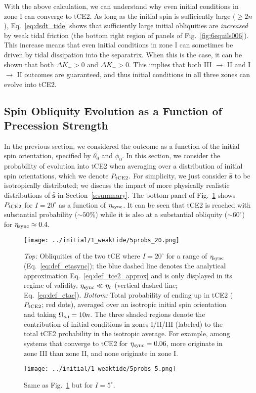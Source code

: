 \documentclass[
        fleqn,
        usenatbib,
        referee,
    ]{mnras}
\newcommand*{\uv}[1]{\hat{\boldsymbol{\mathbf{#1}}}}
\newlength{\colummwidth}
\begin{document}
With the above calculation, we can understand why even initial conditions in
zone I can converge to tCE2. As long as the initial spin is sufficiently large
($\geq 2n$), Eq.~\eqref{eq:dsdt_tide} shows that sufficiently large initial
obliquities are \emph{increased} by weak tidal friction (the bottom right
region of panels of Fig.~\ref{fig:6equils006}). This increase means that even
initial conditions in zone I can sometimes be driven by tidal dissipation into
the separatrix. When this is the case, it can be shown that both $\Delta K_+ >
0$ and $\Delta K_- > 0$. This implies that both III $\to$ II and I $\to$ II
outcomes are guaranteed, and thus initial conditions in all three zones can
evolve into tCE2.

\subsection{Spin Obliquity Evolution as a Function of Precession Strength
}\label{ss:tce2_etasync}

In the previous section, we considered the outcome as a function of the initial
spin orientation, specified by $\theta_0$ and $\phi_0$. In this section, we
consider the probability of evolution into tCE2 when averaging over a
distribution of initial spin orientations, which we denote $P_{\rm tCE2}$. For
simplicity, we just consider $\uv{s}$ to be isotropically distributed; we
discuss the impact of more physically realistic distributions of $\uv{s}$ in
Section~\ref{s:summary}. The bottom panel of Fig.~\ref{fig:probs20} shows
$P_{\rm tCE2}$ for $I = 20^\circ$ as a function of $\eta_{\rm sync}$. It can be
seen that tCE2 is reached with substantial probability ($\sim 50\%$) while it is
also at a substantial obliquity ($\sim 60^\circ$) for $\eta_{\rm sync} \approx
0.4$.
\begin{figure}
    \centering
    \texttt{[image: ../initial/1\_weaktide/5probs\_20.png]}
    \caption{\emph{Top:} Obliquities of the two tCE where $I = 20^\circ$ for a
    range of $\eta_{\rm sync}$ (Eq.~\ref{eq:def_etasync}); the blue dashed line
    denotes the analytical approximation Eq.~\eqref{eq:def_tce2_approx} and is
    only displayed in its regime of validity, $\eta_{\rm sync} \ll \eta_{\rm c}$
    (vertical dashed line; Eq.~\ref{eq:def_etac}). \emph{Bottom:} Total
    probability of ending up in tCE2 ($P_{\rm tCE2}$; red dots), averaged over
    an isotropic initial spin orientation and taking $\Omega_{\rm s, i} = 10n$.
    The three shaded regions denote the contribution of initial conditions in
    zones I/II/III (labeled) to the total tCE2 probability in the isotropic
    average. For example, among systems that converge to tCE2 for $\eta_{\rm
    sync} = 0.06$, more originate in zone III than zone II, and none originate
    in zone I.}\label{fig:probs20}
\end{figure}
\begin{figure}
    \centering
    \texttt{[image: ../initial/1\_weaktide/5probs\_5.png]}
    \caption{Same as Fig.~\ref{fig:probs20} but for $I =
    5^\circ$.}\label{fig:probs5}
\end{figure}
\end{document}
